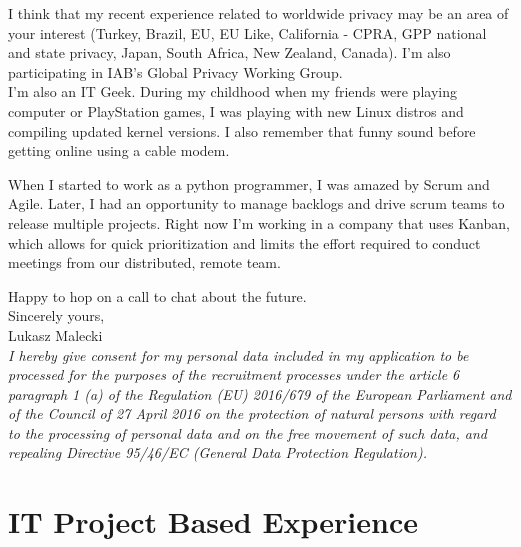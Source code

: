 \documentclass[11pt,a4paper,sans]{moderncv} %
\begin{document}
I think that my recent experience related to worldwide privacy may be an area of your interest (Turkey, Brazil, EU, EU Like, California - CPRA, GPP national and state privacy, Japan, South Africa, New Zealand, Canada). I'm also participating in IAB's Global Privacy Working Group. \\

I'm also an IT Geek. During my childhood when my friends were playing computer or PlayStation games, I was playing with new Linux distros and compiling updated kernel versions. I also remember that funny sound before getting online using a cable modem.

When I started to work as a python programmer, I was amazed by Scrum and Agile. Later, I had an opportunity to manage backlogs and drive scrum teams to release multiple projects. Right now I'm working in a company that uses Kanban, which allows for quick prioritization and limits the effort required to conduct meetings from our distributed, remote team.

Happy to hop on a call to chat about the future. \\
Sincerely yours, \\
Lukasz Malecki \\

\textit{I hereby give consent for my personal data included in my application to be processed for the purposes of the recruitment processes under the article 6 paragraph 1 (a) of the Regulation (EU) 2016/679 of the European Parliament and of the Council of 27 April 2016 on the protection of natural persons with regard to the processing of personal data and on the free movement of such data, and repealing Directive 95/46/EC (General Data Protection Regulation).}

\clearpage
\makecvtitle{}

\section{IT Project Based Experience}
\end{document}
